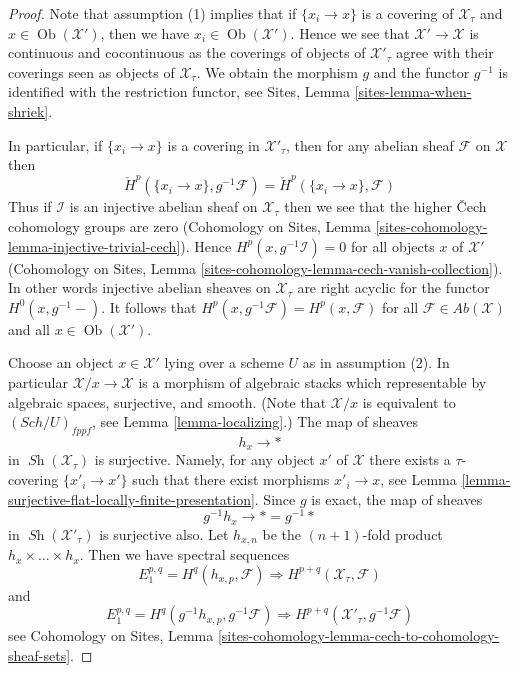\documentclass{stacks-project}
\theoremstyle{plain}
\theoremstyle{definition}
\theoremstyle{remark}
\numberwithin{equation}{subsection}
\def\Sch{\mathit{Sch}}
\def\Ob{\mathop{\mathrm{Ob}}\nolimits}
\def\Sh{\mathop{\mathit{Sh}}\nolimits}
\begin{document}
\begin{proof}
Note that assumption (1) implies that if $\{x_i \to x\}$ is a covering
of $\mathcal{X}_\tau$ and $x \in \Ob(\mathcal{X}')$, then we have
$x_i \in \Ob(\mathcal{X}')$. Hence we see that $\mathcal{X}' \to \mathcal{X}$
is continuous and cocontinuous as the coverings of objects of
$\mathcal{X}'_\tau$ agree with their coverings seen as objects of
$\mathcal{X}_\tau$. We obtain the morphism $g$ and the functor
$g^{-1}$ is identified with the restriction functor, see
Sites, Lemma \ref{sites-lemma-when-shriek}.

\medskip\noindent
In particular, if $\{x_i \to x\}$ is a covering in $\mathcal{X}'_\tau$,
then for any abelian sheaf $\mathcal{F}$ on $\mathcal{X}$ then
$$
\check H^p(\{x_i \to x\}, g^{-1}\mathcal{F}) =
\check H^p(\{x_i \to x\}, \mathcal{F})
$$
Thus if $\mathcal{I}$ is an injective abelian sheaf on $\mathcal{X}_\tau$
then we see that the higher {\v C}ech cohomology groups are zero
(Cohomology on Sites,
Lemma \ref{sites-cohomology-lemma-injective-trivial-cech}).
Hence $H^p(x, g^{-1}\mathcal{I}) = 0$ for all objects $x$
of $\mathcal{X}'$
(Cohomology on Sites,
Lemma \ref{sites-cohomology-lemma-cech-vanish-collection}).
In other words injective abelian sheaves on $\mathcal{X}_\tau$
are right acyclic for the functor $H^0(x, g^{-1}-)$.
It follows that $H^p(x, g^{-1}\mathcal{F}) = H^p(x, \mathcal{F})$
for all $\mathcal{F} \in \textit{Ab}(\mathcal{X})$ and all
$x \in \Ob(\mathcal{X}')$.

\medskip\noindent
Choose an object $x \in \mathcal{X}'$ lying over a scheme $U$
as in assumption (2). In particular $\mathcal{X}/x \to \mathcal{X}$
is a morphism of algebraic stacks which representable by algebraic spaces,
surjective, and smooth. (Note that $\mathcal{X}/x$ is equivalent to
$(\Sch/U)_{fppf}$, see Lemma \ref{lemma-localizing}.)
The map of sheaves
$$
h_x \longrightarrow *
$$
in $\Sh(\mathcal{X}_\tau)$ is surjective. Namely, for any object $x'$
of $\mathcal{X}$ there exists a $\tau$-covering $\{x'_i \to x'\}$
such that there exist morphisms $x'_i \to x$, see
Lemma \ref{lemma-surjective-flat-locally-finite-presentation}.
Since $g$ is exact, the map of sheaves
$$
g^{-1}h_x \longrightarrow * = g^{-1}*
$$
in $\Sh(\mathcal{X}'_\tau)$ is surjective also. Let $h_{x, n}$ be
the $(n + 1)$-fold product $h_x \times \ldots \times h_x$.
Then we have spectral sequences
\begin{equation}
\label{equation-spectral-sequence-one}
E_1^{p, q} = H^q(h_{x, p}, \mathcal{F}) \Rightarrow
H^{p + q}(\mathcal{X}_\tau, \mathcal{F})
\end{equation}
and
\begin{equation}
\label{equation-spectral-sequence-two}
E_1^{p, q} = H^q(g^{-1}h_{x, p}, g^{-1}\mathcal{F}) \Rightarrow
H^{p + q}(\mathcal{X}'_\tau, g^{-1}\mathcal{F})
\end{equation}
see Cohomology on Sites,
Lemma \ref{sites-cohomology-lemma-cech-to-cohomology-sheaf-sets}.


\end{proof}
\end{document}
